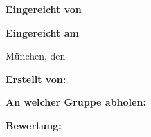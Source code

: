 \vspace*{4.3mm}
\textbf{Eingereicht von}\tab
\begin{minipage}[t]{\textwidth-\CurrentLineWidth}
\EingereichtVon
\end{minipage}

\vspace*{-1mm}
\textbf{Eingereicht am}\tab 
\begin{minipage}[t]{\textwidth-\CurrentLineWidth}
München, den \Datum\strut
\end{minipage}

\vspace*{-1mm}
\textbf{Erstellt von: }\tab 
\begin{minipage}[t]{\textwidth-\CurrentLineWidth}
\ErstelltVon\strut
\end{minipage}

\vspace*{-1mm}
\textbf{An welcher Gruppe abholen: }\tab 
\begin{minipage}[t]{\textwidth-\CurrentLineWidth}
\AbholenGruppe\strut
\end{minipage}

\vspace*{-1mm}
\textbf{Bewertung: }\tab 
\begin{minipage}[t]{\textwidth-\CurrentLineWidth}
\Bewertung\strut
\end{minipage}








